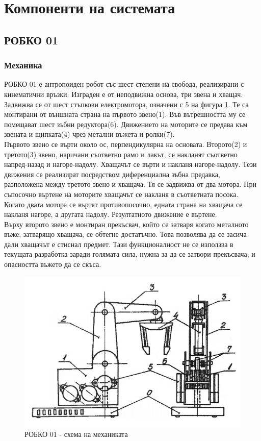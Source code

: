 \section{Компоненти на системата}
\subsection{РОБКО 01}
\FloatBarrier
\subsubsection{Механика}
\indent{}
РОБКО 01 е антропоиден робот със шест степени на свобода, реализирани с кинематични връзки.
\cite{robko-man}
Изграден е от неподвижна основа, три звена и хващач. Задвижва се от шест стъпкови електромотора, означени с 5 на фигура \ref{fig:mech}. Те са монтирани от външната страна на първото звено(1). Във вътрешността му се помещават шест зъбни редуктора(6). Движението на моторите се предава към звената и щипката(4) чрез метални въжета и ролки(7).\\
\indent{}
Първото звено се върти около ос, перпендикулярна на основата. Второто(2) и третото(3) звено, наричани съответно рамо и лакът, се накланят съответно напред-назад и нагоре-надолу. Хващачът се върти и накланя нагоре-надолу. Тези движения се реализират посредством диференциална зъбна предавка, разположена между третото звено и хващача. Тя се задвижва от два мотора. При съпосочно въртене на моторите хващачът се накланя в съответната посока. Когато двата мотора се въртят противопосочно, едната страна на хващача се накланя нагоре, а другата надолу. Резултатното движение е въртене.\\
\indent{}
Върху второто звено е монтиран прекъсвач, който се затваря когато металното въже, затварящо хващача, се обтегне достатъчно. Това позволява да се засича дали хващачът е стиснал предмет. Тази функционалност не се използва в текущата разработка заради голямата сила, нужна за да се затвори прекъсвача, и опасността въжето да се скъса.
\begin{figure}[H]
    \centering
    \includegraphics[width=\linewidth]{pictures/Robko_axis.PNG}
    \caption{РОБКО 01 - схема на механиката}
    \label{fig:mech}
\end{figure}
\FloatBarrier
